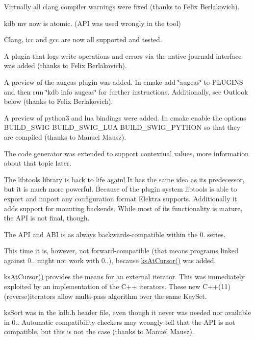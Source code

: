 Virtually all clang compiler warnings were fixed (thanks to Felix Berlakovich).

kdb mv now is atomic. (A\+PI was used wrongly in the tool)

Clang, icc and gcc are now all supported and tested.

A plugin that logs write operations and errors via the native journald interface was added (thanks to Felix Berlakovich).

A preview of the augeas plugin was added. In cmake add \char`\"{}augeas\char`\"{} to P\+L\+U\+G\+I\+NS and then run \char`\"{}kdb info augeas\char`\"{} for further instructions. Additionally, see Outlook below (thanks to Felix Berlakovich).

A preview of python3 and lua bindings were added. In cmake enable the options {\ttfamily B\+U\+I\+L\+D\+\_\+\+S\+W\+IG B\+U\+I\+L\+D\+\_\+\+S\+W\+I\+G\+\_\+\+L\+UA B\+U\+I\+L\+D\+\_\+\+S\+W\+I\+G\+\_\+\+P\+Y\+T\+H\+ON} so that they are compiled (thanks to Manuel Mausz).

The code generator was extended to support contextual values, more information about that topic later.

The libtools library is back to life again! It has the same idea as its predecessor, but it is much more powerful. Because of the plugin system libtools is able to export and import any configuration format Elektra supports. Additionally it adds support for mounting backends. While most of its functionality is mature, the A\+PI is not final, though.

The A\+PI and A\+BI is as always backwards-\/compatible within the 0. series.

This time it is, however, not forward-\/compatible (that means programs linked against 0.. might not work with 0..), because \mbox{\hyperlink{group__keyset_ga3604cc41505f7e19db945cece67190b6}{ks\+At\+Cursor()}} was added.

\mbox{\hyperlink{group__keyset_ga3604cc41505f7e19db945cece67190b6}{ks\+At\+Cursor()}} provides the means for an external iterator. This was immediately exploited by an implementation of the C++ iterators. These new C++(11) (reverse)iterators allow multi-\/pass algorithm over the same Key\+Set.

ks\+Sort was in the kdb.\+h header file, even though it never was needed nor available in 0.. Automatic compatibility checkers may wrongly tell that the A\+PI is not compatible, but this is not the case (thanks to Manuel Mausz).

